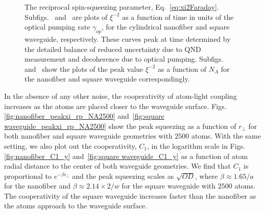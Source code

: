 \documentclass[aps,pra,twocolumn,superscriptaddress]{revtex4-1} %
\newcommand{\SWG}{square waveguide\xspace}%
\begin{document}
\begin{figure}[htb]
\centering
 \begin{minipage}[h]{0.99\linewidth}
    \hfill
   \end{minipage}\vfill
   \begin{minipage}[h]{0.99\linewidth}
       \hfill
   \end{minipage}
\caption{ The reciprocal spin-squeezing parameter, Eq.~\eqref{eq:xi2Faraday}.  Subfigs.~\protect{} and~\protect{} are plots of $ \xi^{-2} $  as a function of time in units of the optical pumping rate $\gamma_{op}$, for the cylindrical nanofiber and square waveguide, respectively. These curves peak at time determined by the detailed balance of reduced uncertainty due to QND measurement and decoherence due to optical pumping.  Subfigs.~\protect{} and~\protect{} show the plots of the peak value $ \xi^{-2} $ as a function of $ N_A $ for the nanofiber and square waveguide correspondingly. }\label{fig:xi_rpfix_NA_t}
\end{figure}

In the absence of any other noise, the cooperativity of atom-light coupling increases as the atoms are placed closer to the waveguide surface. Figs.\ref{fig:nanofiber_peakxi_rp_NA2500} and~\ref{fig:square waveguide_peakxi_rp_NA2500} show the peak squeezing  as a function of $ r\!_\perp $ for both nanofiber and square waveguide geometries with $2500$ atoms. With the same setting, we also plot out the cooperativity, $ C_1 $, in the logarithm scale in Figs.\ref{fig:nanofiber_C1_y} and~\ref{fig:square waveguide_C1_y} as a function of atom radial distance to the center of both waveguide geometries. We find that $C_1$ is proportional to $ e^{-\beta r\!_\perp} $ and the peak squeezing scales as $ \sqrt{OD} $, where $ \beta \approx 1.65/a $ for the nanofiber and $ \beta \approx 2.14\times 2/w $ for the \SWG with $2500$ atoms. The cooperativity of the \SWG increases faster than the nanofiber as the atoms approach to the waveguide surface. 
\end{document}
